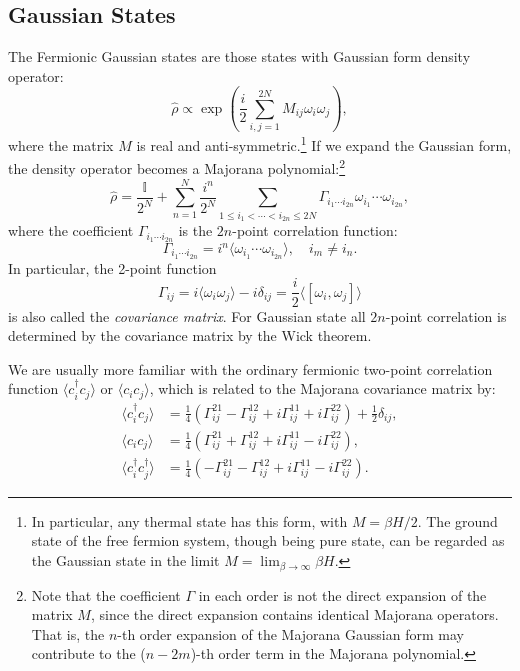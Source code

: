 \documentclass[aps,prb,superscriptaddress,nofootinbib]{revtex4}
\begin{document}
\subsection{Gaussian States}
The Fermionic Gaussian states are those states with Gaussian form density operator:
\begin{equation}
	\hat \rho \propto \exp \left(\frac{i}{2}\sum_{i,j=1}^{2N}M_{ij}\omega_i \omega_j \right),
\end{equation}
where the matrix $M$ is real and anti-symmetric.\footnote{In particular, any thermal state has this form, with $M = \beta H/2$. The ground state of the free fermion system, though being pure state, can be regarded as the Gaussian state in the limit $M = \lim_{\beta \rightarrow \infty} \beta H$.}
If we expand the Gaussian form, the density operator becomes a Majorana polynomial:\footnote{Note that the coefficient $\Gamma$ in each order is not the direct expansion of the matrix $M$, since the direct expansion contains identical Majorana operators. That is, the $n$-th order expansion of the Majorana Gaussian form may contribute to the ($n-2m$)-th order term in the Majorana polynomial.}
\begin{equation}
	\hat{\rho} = \frac{\mathbb{I}}{2^N} + \sum_{n=1}^{N}\frac{i^n}{2^N}\sum_{1\le i_{1}<\cdots<i_{2n} \le 2N}\Gamma_{i_{1}\cdots i_{2n}} \omega_{i_1}\cdots\omega_{i_{2n}},
\end{equation}
where the coefficient $\Gamma_{i_1 \cdots i_{2n}}$ is the $2n$-point correlation function:
\begin{equation}
	\Gamma_{i_1 \cdots i_{2n}} = i^n \langle \omega_{i_1} \cdots \omega_{i_{2n}}\rangle, \quad i_m \ne i_n.
\end{equation}
In particular, the 2-point function 
\begin{equation}
	\Gamma_{ij} = i\langle \omega_i \omega_j\rangle - i\delta_{ij} = \frac{i}{2}\langle [\omega_i, \omega_j]\rangle
\end{equation}
is also called the \textit{covariance matrix}. 
For Gaussian state all $2n$-point correlation is determined by the covariance matrix by the Wick theorem.

We are usually more familiar with the ordinary fermionic two-point correlation function $\langle c^\dagger_i c_j\rangle$ or $\langle c_i c_j\rangle$, which is related to the Majorana covariance matrix by:
\begin{equation}
\begin{aligned}
	\langle c_i^\dagger c_j\rangle &= \frac{1}{4}(
		\Gamma^{21}_{ij} - \Gamma^{12}_{ij} + 
		i \Gamma^{11}_{ij} + i \Gamma^{22}_{ij})
		+\frac{1}{2}\mathbb \delta_{ij}, \\
	\langle c_i c_j\rangle &= \frac{1}{4}(
		\Gamma^{21}_{ij} + \Gamma^{12}_{ij} + 
		i \Gamma^{11}_{ij} - i \Gamma^{22}_{ij}), \\
	\langle c_i^\dagger c_j^\dagger\rangle &= \frac{1}{4}(
		-\Gamma^{21}_{ij} - \Gamma^{12}_{ij} + 
		i \Gamma^{11}_{ij} - i \Gamma^{22}_{ij}).
\end{aligned}
\end{equation}
\end{document}
